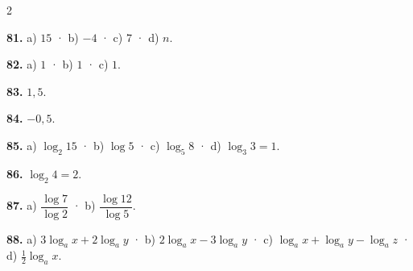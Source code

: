 \documentclass[13pt,a4paper]{extarticle}
\begin{document}
\begin{multicols}{2}
\begin{minipage}{\linewidth}
\textbf{81.} a) $15$ · b) $-4$ · c) $7$ · d) $n$.\par
\end{minipage}\par\vspace{1.6mm}
\par\noindent\begin{minipage}{\linewidth}
\textbf{82.} a) $1$ · b) $1$ · c) $1$.\par
\end{minipage}\par\vspace{1.6mm}
\par\noindent\begin{minipage}{\linewidth}
\textbf{83.} $1{,}5$.\par
\end{minipage}\par\vspace{1.6mm}
\par\noindent\begin{minipage}{\linewidth}
\textbf{84.} $-0{,}5$.\par
\end{minipage}\par\vspace{1.6mm}
\par\noindent\begin{minipage}{\linewidth}
\textbf{85.} a) $\log_2 15$ · b) $\log 5$ · c) $\log_5 8$ · d) $\log_3 3=1$.\par
\end{minipage}\par\vspace{1.6mm}
\par\noindent\begin{minipage}{\linewidth}
\textbf{86.} $\log_2 4=2$.\par
\end{minipage}\par\vspace{1.6mm}
\par\noindent\begin{minipage}{\linewidth}
\textbf{87.} a) $\dfrac{\log 7}{\log 2}$ · b) $\dfrac{\log 12}{\log 5}$.\par
\end{minipage}\par\vspace{1.6mm}
\par\noindent\begin{minipage}{\linewidth}
\textbf{88.} a) $3\log_a x+2\log_a y$ · b) $2\log_a x-3\log_a y$ · c) $\log_a x+\log_a y-\log_a z$ · d) $\tfrac12\log_a x$.\par

\end{minipage}
\end{multicols}
\end{document}
